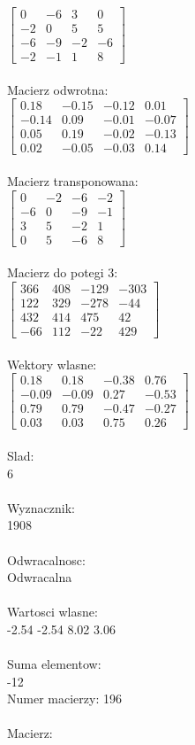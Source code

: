 \documentclass[a4paper,12pt]{article}
\begin{document}
$\begin{bmatrix} 0&-6&3&0\\-2&0&5&5\\-6&-9&-2&-6\\-2&-1&1&8 \end{bmatrix}$
\\
\\
Macierz odwrotna:\\

$\begin{bmatrix} 0.18&-0.15&-0.12&0.01\\-0.14&0.09&-0.01&-0.07\\0.05&0.19&-0.02&-0.13\\0.02&-0.05&-0.03&0.14 \end{bmatrix}$
\\
\\
Macierz transponowana:\\

$\begin{bmatrix} 0&-2&-6&-2\\-6&0&-9&-1\\3&5&-2&1\\0&5&-6&8 \end{bmatrix}$
\\
\\
Macierz do potegi 3:\\

$\begin{bmatrix} 366&408&-129&-303\\122&329&-278&-44\\432&414&475&42\\-66&112&-22&429 \end{bmatrix}$
\\
\\
Wektory wlasne:\\

$\begin{bmatrix} 0.18&0.18&-0.38&0.76\\-0.09&-0.09&0.27&-0.53\\0.79&0.79&-0.47&-0.27\\0.03&0.03&0.75&0.26 \end{bmatrix}$
\\
\\
Slad:\\
6
\\
\\
Wyznacznik:\\
1908
\\
\\
Odwracalnosc:\\
Odwracalna
\\
\\
Wartosci wlasne:\\
-2.54 -2.54 8.02 3.06
\\
\\
Suma elementow:\\
-12
\\
\newpage
Numer macierzy:
196
\\
\\
Macierz:\\
\end{document}
